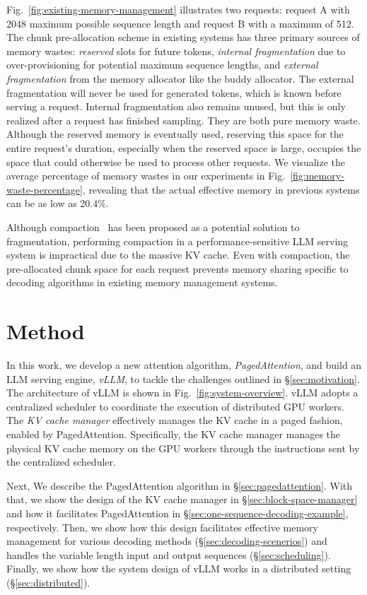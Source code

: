 Fig.~\ref{fig:existing-memory-management} illustrates two requests: request A with 2048 maximum possible sequence length and request B with a maximum of 512. The chunk pre-allocation scheme in existing systems has three primary sources of memory wastes: \emph{reserved} slots for future tokens, \emph{internal fragmentation} due to over-provisioning for potential maximum sequence lengths, and \emph{external fragmentation} from the memory allocator like the buddy allocator. The external fragmentation will never be used for generated tokens, which is known before serving a request. Internal fragmentation also remains unused, but this is only realized after a request has finished sampling. They are both pure memory waste. Although the reserved memory is eventually used, reserving this space for the entire request's duration, especially when the reserved space is large, occupies the space that could otherwise be used to process other requests. We visualize the average percentage of memory wastes in our experiments in Fig.~\ref{fig:memory-waste-percentage}, revealing that the actual effective memory in previous systems can be as low as 20.4\%.

Although compaction~\cite{wang2022pacman} has been proposed as a potential solution to fragmentation, performing compaction in a performance-sensitive LLM serving system is impractical due to the massive KV cache. Even with compaction, the pre-allocated chunk space for each request prevents memory sharing specific to decoding algorithms in existing memory management systems.

\section{Method}

In this work, we develop a new attention algorithm, \emph{PagedAttention}, and build an LLM serving engine, \emph{vLLM}, to tackle the challenges outlined in \S\ref{sec:motivation}. The architecture of vLLM is shown in Fig.~\ref{fig:system-overview}. vLLM adopts a centralized scheduler to coordinate the execution of distributed GPU workers. The \emph{KV cache manager} effectively manages the KV cache in a paged fashion, enabled by PagedAttention. Specifically, the KV cache manager manages the physical KV cache memory on the GPU workers through the instructions sent by the centralized scheduler.

Next, We describe the PagedAttention algorithm in \S\ref{sec:pagedattention}. With that, we show the design of the KV cache manager in \S\ref{sec:block-space-manager} and how it facilitates PagedAttention in \S\ref{sec:one-sequence-decoding-example}, respectively. Then, we show how this design facilitates effective memory management for various decoding methods (\S\ref{sec:decoding-scenerios}) and handles the variable length input and output sequences (\S\ref{sec:scheduling}). Finally, we show how the system design of vLLM works in a distributed setting (\S\ref{sec:distributed}). 

